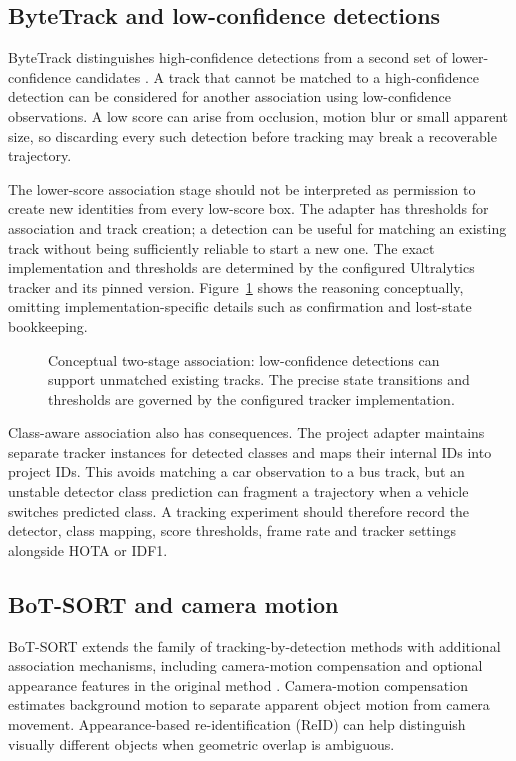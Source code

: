 \subsection{ByteTrack and low-confidence detections}
ByteTrack distinguishes high-confidence detections from a second set of lower-confidence candidates \cite{bytetrack}. A track that cannot be matched to a high-confidence detection can be considered for another association using low-confidence observations. A low score can arise from occlusion, motion blur or small apparent size, so discarding every such detection before tracking may break a recoverable trajectory.

The lower-score association stage should not be interpreted as permission to create new identities from every low-score box. The adapter has thresholds for association and track creation; a detection can be useful for matching an existing track without being sufficiently reliable to start a new one. The exact implementation and thresholds are determined by the configured Ultralytics tracker and its pinned version. Figure~\ref{fig:association} shows the reasoning conceptually, omitting implementation-specific details such as confirmation and lost-state bookkeeping.

\begin{figure}[htbp]
\centering

\caption{Conceptual two-stage association: low-confidence detections can support unmatched existing tracks. The precise state transitions and thresholds are governed by the configured tracker implementation.}
\label{fig:association}
\end{figure}

Class-aware association also has consequences. The project adapter maintains separate tracker instances for detected classes and maps their internal IDs into project IDs. This avoids matching a car observation to a bus track, but an unstable detector class prediction can fragment a trajectory when a vehicle switches predicted class. A tracking experiment should therefore record the detector, class mapping, score thresholds, frame rate and tracker settings alongside HOTA or IDF1.

\subsection{BoT-SORT and camera motion}
BoT-SORT extends the family of tracking-by-detection methods with additional association mechanisms, including camera-motion compensation and optional appearance features in the original method \cite{botsort}. Camera-motion compensation estimates background motion to separate apparent object motion from camera movement. Appearance-based re-identification (ReID) can help distinguish visually different objects when geometric overlap is ambiguous.

